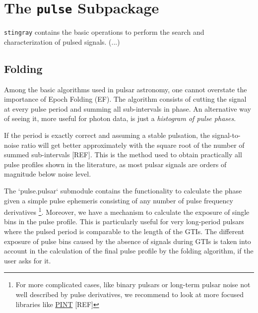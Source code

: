\documentclass[12pt]{emulateapj}
\newcommand{\stingray}{\texttt{stingray}\xspace}
\begin{document}
\section{The \texttt{pulse} Subpackage}
\label{sec:pulsar}
\stingray contains the basic operations to perform the search and characterization of pulsed signals.
(...)
\subsection{Folding}
Among the basic algorithms used in pulsar astronomy, one cannot overstate the importance of Epoch Folding (EF).
The algorithm consists of cutting the signal at every pulse period and summing all sub-intervals in phase. 
An alternative way of seeing it, more useful for photon data, is just a \textit {histogram of pulse phases}.

If the period is exactly correct and assuming a stable pulsation, the signal-to-noise ratio will get better approximately with the square root of the number of summed sub-intervals [REF].
This is the method used to obtain practically all pulse profiles shown in the literature, as most pulsar signals are orders of magnitude below noise level.

The `pulse.pulsar` submodule contains the functionality to calculate the phase given a simple pulse ephemeris consisting of any number of pulse frequency derivatives%
\footnote{For more complicated cases, like binary pulsars or long-term pulsar noise not well described by pulse derivatives, we recommend to look at more focused libraries like \href{https://github.com/nanograv/PINT}{PINT} [REF]}.
Moreover, we have a mechanism to calculate the exposure of single bins in the pulse profile. 
This is particularly useful for very long-period pulsars where the pulsed period is comparable to the length of the GTIs.
The different exposure of pulse bins caused by the absence of signals during GTIs is taken into account in the calculation of the final pulse profile by the folding algorithm, if the user asks for it. 
\end{document}
